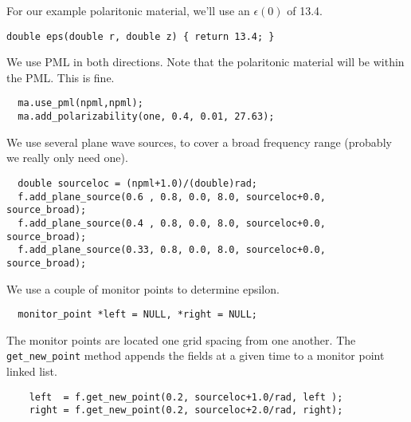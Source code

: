 For our example polaritonic material, we'll use an $\epsilon(0)$ of 13.4.

\begin{verbatim}
double eps(double r, double z) { return 13.4; }
\end{verbatim}
\begin{comment}
double one(double r, double z) { return 1; }

int main(int argc, char **argv) {
  deal_with_ctrl_c();
  const double ttot = 600.0;
  mat ma(eps, rmax + npml/(double)rad, zsize, rad);
  const char *dirname = make_output_directory(argv[0]);
  printf("Storing output in directory %
  ma.set_output_directory(dirname);
\end{comment}
We use PML in both directions.  Note that the polaritonic material will be
within the PML.  This is fine.
\begin{verbatim}
  ma.use_pml(npml,npml);
  ma.add_polarizability(one, 0.4, 0.01, 27.63);
\end{verbatim}
\begin{comment}
  fields f(&ma, m);
\end{comment}
We use several plane wave sources, to cover a broad frequency range
(probably we really only need one).
\begin{verbatim}
  double sourceloc = (npml+1.0)/(double)rad;
  f.add_plane_source(0.6 , 0.8, 0.0, 8.0, sourceloc+0.0, source_broad);
  f.add_plane_source(0.4 , 0.8, 0.0, 8.0, sourceloc+0.0, source_broad);
  f.add_plane_source(0.33, 0.8, 0.0, 8.0, sourceloc+0.0, source_broad);
\end{verbatim}
\begin{comment}
  printf("Working on m = %
\end{comment}
We use a couple of monitor points to determine epsilon.
\begin{verbatim}
  monitor_point *left = NULL, *right = NULL;
\end{verbatim}
\begin{comment}
  double next_printtime = 50;
  while (f.time() < ttot && !interrupt) {
    if (f.time() >= next_printtime) {
      next_printtime += 50;
      printf("Working on time %
      printf("energy is %
    }
\end{comment}
The monitor points are located one grid spacing from one another.  The
\verb*|get_new_point| method appends the fields at a given time to a
monitor point linked list.
\begin{verbatim}
    left  = f.get_new_point(0.2, sourceloc+1.0/rad, left );
    right = f.get_new_point(0.2, sourceloc+2.0/rad, right);
\end{verbatim}
